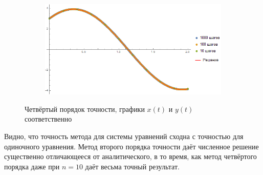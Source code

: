 \documentclass[a4paper,12pt,titlepage,finall]{article}
\begin{document}
\begin{enumerate}
\begin{figure}[h]
\begin{subfigure}{.5\textwidth}
\end{subfigure}%
\begin{subfigure}{.5\textwidth}
  \centering
  \includegraphics[width=\textwidth]{test_1_5_4_y.png}
\end{subfigure}
\caption{Четвёртый порядок точности, графики $x(t)$ и $y(t)$ соответственно}
\end{figure}
\par
Видно, что точность метода для системы уравнений сходна с точностью для одиночного уравнения. Метод второго порядка точности даёт численное решение существенно отличающееся от аналитического, в то время, как метод четвёртого порядка даже при $n=10$ даёт весьма точный результат.


\end{enumerate}
\end{document}
